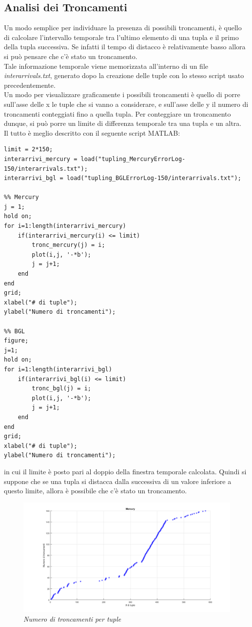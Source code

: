 \subsection{Analisi dei Troncamenti}
Un modo semplice per individuare la presenza di possibili troncamenti, è quello di calcolare l'intervallo temporale tra l'ultimo elemento di una tupla e il primo della tupla successiva. Se infatti il tempo di distacco è relativamente basso allora si può pensare che c'è stato un troncamento.
\\Tale informazione temporale viene memorizzata all'interno di un file \textit{interarrivals.txt}, generato dopo la creazione delle tuple con lo stesso script usato precedentemente.
\\Un modo per visualizzare graficamente i possibili troncamenti è quello di porre sull'asse delle x le tuple che si vanno a considerare, e sull'asse delle y il numero di troncamenti conteggiati fino a quella tupla. Per conteggiare un troncamento dunque, si può porre un limite di differenza temporale tra una tupla e un altra.
\\Il tutto è meglio descritto con il seguente script MATLAB:
\begin{verbatim}
limit = 2*150;
interarrivi_mercury = load("tupling_MercuryErrorLog-150/interarrivals.txt");
interarrivi_bgl = load("tupling_BGLErrorLog-150/interarrivals.txt");

%% Mercury
j = 1;
hold on;
for i=1:length(interarrivi_mercury)
	if(interarrivi_mercury(i) <= limit)
		tronc_mercury(j) = i;
		plot(i,j, '-*b');
		j = j+1;
	end
end
grid;
xlabel("# di tuple");
ylabel("Numero di troncamenti");

%% BGL
figure;
j=1;
hold on;
for i=1:length(interarrivi_bgl)
	if(interarrivi_bgl(i) <= limit)
		tronc_bgl(j) = i;
		plot(i,j, '-*b');
		j = j+1;
	end 
end
grid;
xlabel("# di tuple");
ylabel("Numero di troncamenti");
\end{verbatim}
in cui il limite è posto pari al doppio della finestra temporale calcolata. Quindi si suppone che se una tupla si distacca dalla successiva di un valore inferiore a questo limite, allora è possibile che c'è stato un troncamento.
\begin{figure}[H]
	\centering
	\includegraphics[width=\textwidth]{img/hw6/troncamento_mercury.png}
	\caption{\textit{Numero di troncamenti per tuple}}
\end{figure}
